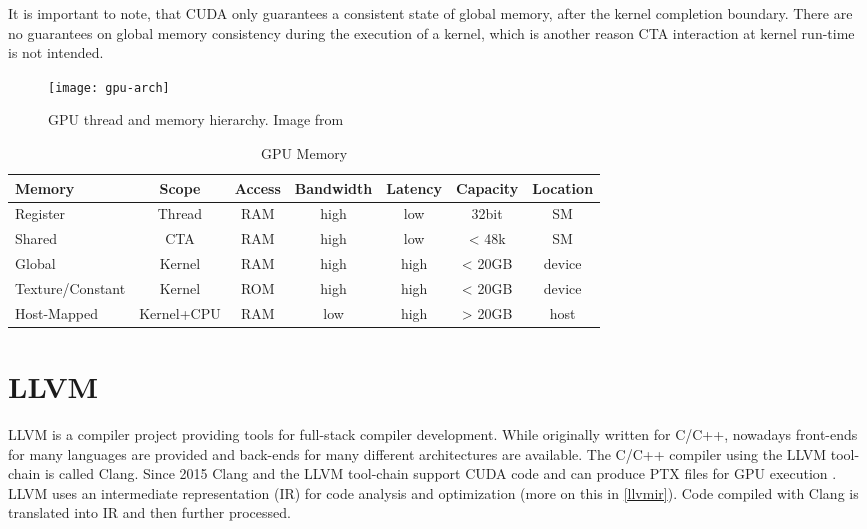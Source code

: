 It is important to note, that CUDA only guarantees a consistent state of global memory, after the kernel completion 
boundary. There are no guarantees on global memory consistency during the execution of a kernel, which is another reason
CTA interaction at kernel run-time is not intended. \cite[B5-B7]{cuda-man}
\begin{figure}[t]
	\centering
	\texttt{[image: gpu-arch]}
	\caption{GPU thread and memory hierarchy. Image from \cite{}}
	\label{gpu-hier}
\end{figure}
\begin{table}
	\centering
	\begin{tabular}{|l|c|c|c|c|c|c|}
		\hline 
		\textbf{Memory} & \textbf{Scope} & \textbf{Access} & \textbf{Bandwidth} & \textbf{Latency} & \textbf{Capacity} & \textbf{Location} \\ 
		\hline
		\hline
		Register  & Thread & RAM & high & low & 32bit & SM \\ 
		Shared  & CTA & RAM & high & low & < 48k & SM \\ 
		Global  & Kernel & RAM & high & high & < 20GB & device \\ 
		Texture/Constant & Kernel & ROM & high & high & < 20GB & device \\ 
		Host-Mapped  & Kernel+CPU & RAM & low & high & > 20GB & host \\ 
		\hline 
	\end{tabular} 
	\caption{GPU Memory\cite[2.3]{cuda-man}}
	\label{GPUMemTable}
\end{table}
\section{LLVM}
LLVM is a compiler project providing tools for full-stack compiler development. While originally written for C/C++, nowadays front-ends for many languages are provided and back-ends for many different architectures are available. The C/C++ compiler using the LLVM tool-chain is called Clang. Since 2015 Clang and the LLVM
tool-chain support CUDA code and can produce PTX files for GPU execution \cite{gpucc}.
LLVM uses an intermediate representation (IR) for code analysis and optimization 
(more on this in \ref{llvmir}). Code compiled with Clang is translated into IR and then further processed. \cite{Lattner:2004:LCF:977395.977673}

